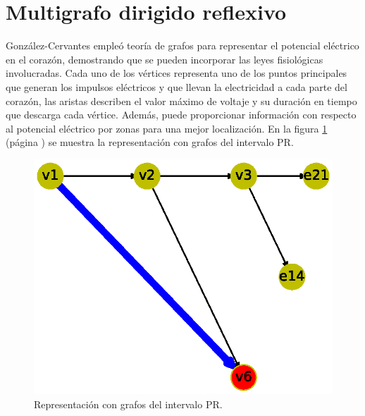 \documentclass{article}
\begin{document}
\section{Multigrafo dirigido reflexivo}
González-Cervantes \cite{gonzalez2016potencial} empleó teoría de grafos para representar el potencial eléctrico en el corazón, demostrando que se pueden incorporar las leyes fisiológicas involucradas. Cada uno de los vértices representa uno de los puntos principales que generan los impulsos eléctricos y que llevan la electricidad a cada parte del corazón, las aristas describen el valor máximo de voltaje y su
duración en tiempo que descarga cada vértice. Además, puede proporcionar información con respecto al potencial eléctrico por zonas para una mejor localización.
En la figura \ref{fig:12} (página \pageref{fig:12}) se muestra la representación con grafos del intervalo PR.




\begin{figure}
  \centering 
  \includegraphics[width=.8\columnwidth]{12.eps}
  \vspace*{-8mm}
  \caption{Representación con grafos del intervalo PR.}
  \label{fig:12}
\end{figure}


\newpage


\end{document}

